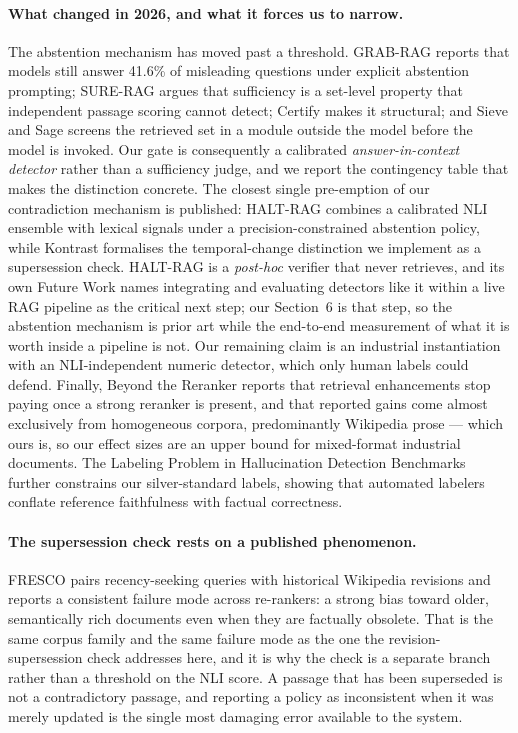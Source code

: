 \documentclass[preprint,3p,times]{elsarticle}
\begin{document}
\paragraph{What changed in 2026, and what it forces us to narrow.}
The abstention mechanism has moved past a threshold. GRAB-RAG
\cite{setiawan2026grabrag} reports that models still answer 41.6\% of misleading
questions under explicit abstention prompting; SURE-RAG \cite{qiu2026surerag}
argues that sufficiency is a set-level property that independent passage
scoring cannot detect; Certify \cite{zhang2026certify} makes it structural; and
Sieve and Sage \cite{won2026sievesage} screens the retrieved set in a module outside
the model before the model is invoked. Our gate is consequently a calibrated
\emph{answer-in-context detector} rather than a sufficiency judge, and we
report the contingency table that makes the distinction concrete. The closest
single pre-emption of our contradiction mechanism is published: HALT-RAG
\cite{goswami2025haltrag} combines a calibrated NLI ensemble with lexical signals
under a precision-constrained abstention policy, while Kontrast
\cite{wei2026kontrast} formalises the temporal-change distinction we implement as
a supersession check. HALT-RAG is a \emph{post-hoc} verifier that never
retrieves, and its own Future Work names integrating and evaluating detectors
like it within a live RAG pipeline as the critical next step; our
Section~6 is that step, so the abstention mechanism is prior art while the
end-to-end measurement of what it is worth inside a pipeline is not. Our
remaining claim is an industrial instantiation with
an NLI-independent numeric detector, which only human labels could defend.
Finally, Beyond the Reranker \cite{singh2026beyondreranker} reports that retrieval
enhancements stop paying once a strong reranker is present, and that reported
gains come almost exclusively from homogeneous corpora, predominantly Wikipedia
prose --- which ours is, so our effect sizes are an upper bound for mixed-format
industrial documents. The Labeling Problem in Hallucination Detection
Benchmarks \cite{valjakka2026labeling} further constrains our silver-standard labels,
showing that automated labelers conflate reference faithfulness with factual
correctness.

\paragraph{The supersession check rests on a published phenomenon.}
FRESCO \cite{an2026fresco} pairs recency-seeking queries with historical
Wikipedia revisions and reports a consistent failure mode across re-rankers:
a strong bias toward older, semantically rich documents even when they are
factually obsolete. That is the same corpus family and the same failure mode as
the one the revision-supersession check addresses here, and it is why the
check is a separate branch rather than a threshold on the NLI score. A passage
that has been superseded is not a contradictory passage, and reporting a
policy as inconsistent when it was merely updated is the single most damaging
error available to the system.
\end{document}
